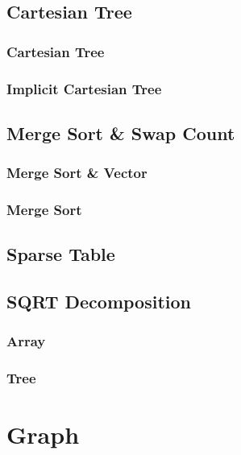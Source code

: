 \documentclass[10pt,a4paper]{report}
\begin{document}
	\section{Cartesian Tree}
		\subsection{Cartesian Tree}
			
		\newpage
		\subsection{Implicit Cartesian Tree}
			
	\newpage		
	\section{Merge Sort \& Swap Count}
		\subsection{Merge Sort \& Vector}
			
		\newpage
		\subsection{Merge Sort}
			
	\newpage
	\section{Sparse Table}
		
	\newpage	
	\section{SQRT Decomposition}
		\subsection{Array}
			
		\newpage
		\subsection{Tree}
			
	
\chapter{Graph}
	
\end{document}
